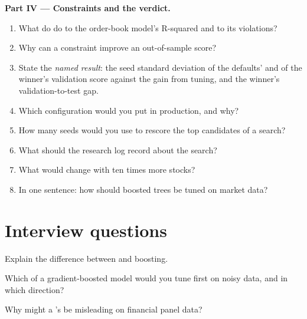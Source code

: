 \begin{problem}
\medskip\noindent\textbf{Part IV --- Constraints and the verdict.}
\begin{enumerate}[resume]
\item What do  do to the order-book model's R-squared and to its violations?
\item Why can a constraint improve an out-of-sample score?
\item State the \emph{named result}: the seed standard deviation of the defaults' and of the winner's validation
score against the gain from tuning, and the winner's validation-to-test gap.
\item Which configuration would you put in production, and why?
\item How many seeds would you use to rescore the top candidates of a search?
\item What should the research log record about the search?
\item What would change with ten times more stocks?
\item In one sentence: how should boosted trees be tuned on market data?
\end{enumerate}
\end{problem}

\section{Interview questions}

\begin{interviewq}\label{iq:ml:trees-and-boosting:1}
Explain the difference between  and boosting.
\end{interviewq}

\begin{interviewq}\label{iq:ml:trees-and-boosting:2}
Which  of a gradient-boosted model would you tune first on noisy data, and in which direction?
\end{interviewq}

\begin{interviewq}\label{iq:ml:trees-and-boosting:3}
Why might a 's  be misleading on financial panel data?
\end{interviewq}

